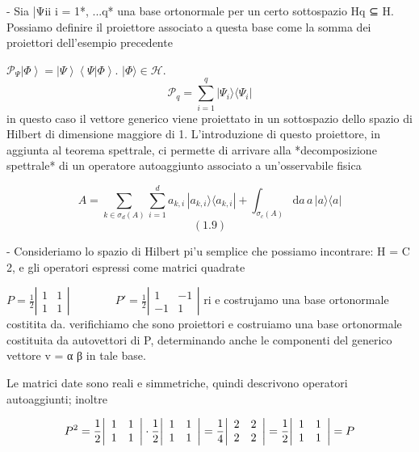 {	- Sia |Ψii i = {1*, ...q*} una base ortonormale per un certo sottospazio Hq ⊆ H. Possiamo definire il proiettore associato a questa base come la somma dei proiettori dell'esempio precedente
	
	$\mathcal{P}_{\Psi}\left|\Phi\right\rangle=\left|\Psi\right\rangle\left\langle\Psi|\Phi\right\rangle$. 
	$|\Phi\rangle\in\mathcal{H}$. 
	$${\mathcal{P}}_{q}=\sum_{i=1}^{q}|\Psi_{i}\rangle\!\langle\Psi_{i}|$$
	in questo caso il vettore generico viene proiettato in un sottospazio dello spazio di Hilbert di dimensione maggiore di 1. L'introduzione di questo proiettore, in aggiunta al teorema spettrale, ci permette di arrivare alla *decomposizione spettrale* di un operatore autoaggiunto associato a un'osservabile fisica
	
	$$A=\sum_{k\in\sigma_{d}(A)}\sum_{i=1}^{d}a_{k,i}\,|a_{k,i}\rangle\!\langle a_{k,i}|+\int_{\sigma_{c}(A)}\mathrm{d}a\,a\,|a\rangle\!\langle a|$$
	$$(1.9)$$
	
	- Consideriamo lo spazio di Hilbert pi'u semplice che possiamo incontrare: H = C
	2, e gli operatori espressi come matrici quadrate
	
	$ P=\frac{1}{2}\left|\begin{array}{ccc}1&1\\ 1&1\end{array}\right|\qquad\qquad P'=\frac{1}{2}\left|\begin{array}{ccc}1&-1\\ -1&1\end{array}\right|$  ri e costrujamo una base ortonormale costitita da. 
	verifichiamo che sono proiettori e costruiamo una base ortonormale costituita da autovettori di P, determinando anche le componenti del generico vettore v =
	α β in tale base.
	
	Le matrici date sono reali e simmetriche, quindi descrivono operatori autoaggiunti; inoltre
	
	$$P^{2}={\frac{1}{2}}{\left|\begin{array}{l l}{1}&{1}\\ {1}&{1}\end{array}\right|}\cdot{\frac{1}{2}}{\left|\begin{array}{l l}{1}&{1}\\ {1}&{1}\end{array}\right|}={\frac{1}{4}}{\left|\begin{array}{l l}{2}&{2}\\ {2}&{2}\end{array}\right|}={\frac{1}{2}}{\left|\begin{array}{l l}{1}&{1}\\ {1}&{1}\end{array}\right|}=P$$
	
}

